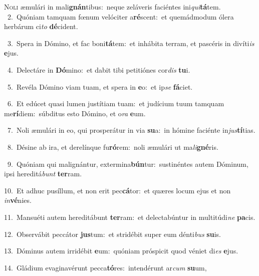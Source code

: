 \lettrine{\initial\textcolor{\initialcolor}{N}}{oli} æmulári in mali\-\textbf{gnán}\-tibus:~\star neque zeláveris faciéntes ini\-\textit{qui}\-\textbf{tá}tem.\\
{\numbfont\textcolor{\numbcolor}{~2.}}~Quóniam tamquam fœnum velóciter a\-\textbf{ré}\-scent:~\star et quemádmodum ólera herbárum ci\textit{to} \textbf{dé}\-cident.\par
{\numbfont\textcolor{\numbcolor}{~3.}}~Spera in Dómino, et fac boni\-\textbf{tá}\-tem:~\star et inhábita terram, et pascéris in divíti\textit{is} \textbf{e}\-jus.\par
{\numbfont\textcolor{\numbcolor}{~4.}}~Delectáre in \textbf{Dó}\-mino:~\star et dabit tibi petitiónes cor\textit{dis} \textbf{tu}\-i.\par
{\numbfont\textcolor{\numbcolor}{~5.}}~Revéla Dómino viam tuam, et spera in \textbf{e}\-o:~\star et ip\textit{se} \textbf{fá}\-ciet.\par
{\numbfont\textcolor{\numbcolor}{~6.}}~Et edúcet quasi lumen justítiam tuam:~\dagger et judícium tuum tamquam me\-\textbf{rí}\-diem:~\star súbditus esto Dómino, et o\textit{ra} \textbf{e}\-um.\par
{\numbfont\textcolor{\numbcolor}{~7.}}~Noli æmulári in eo, qui prosperátur in via \textbf{su}\-a:~\star in hómine faciénte in\-\textit{jus}\-\textbf{tí}tias.\par
{\numbfont\textcolor{\numbcolor}{~8.}}~Désine ab ira, et derelínque fu\-\textbf{ró}\-rem:~\star noli æmulári ut ma\-\textit{li}\-\textbf{gné}ris.\par
{\numbfont\textcolor{\numbcolor}{~9.}}~Quóniam qui malignántur, extermina\-\textbf{bún}\-tur:~\star sustinéntes autem Dóminum, ipsi hereditá\textit{bunt} \textbf{ter}\-ram.\par
{\numbfont\textcolor{\numbcolor}{10.}}~Et adhuc pusíllum, et non erit pec\-\textbf{cá}\-tor:~\star et quæres locum ejus et non \textit{in}\-\textbf{vé}nies.\par
{\numbfont\textcolor{\numbcolor}{11.}}~Mansuéti autem hereditábunt \textbf{ter}\-ram:~\star et delectabúntur in multitúdi\textit{ne} \textbf{pa}\-cis.\par
{\numbfont\textcolor{\numbcolor}{12.}}~Observábit peccátor \textbf{jus}\-tum:~\star et stridébit super eum dénti\textit{bus} \textbf{su}\-is.\par
{\numbfont\textcolor{\numbcolor}{13.}}~Dóminus autem irridébit \textbf{e}\-um:~\star quóniam próspicit quod véniet di\textit{es} \textbf{e}\-jus.\par
{\numbfont\textcolor{\numbcolor}{14.}}~Gládium evaginavérunt pecca\-\textbf{tó}\-res:~\star intendérunt ar\textit{cum} \textbf{su}\-um,\par
